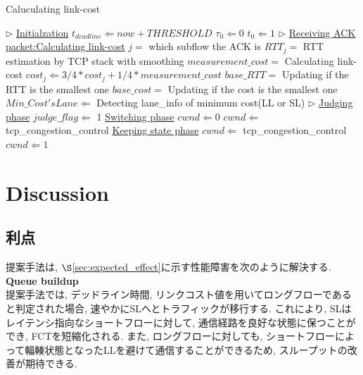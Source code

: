 \begin{algorithm}
\caption{Caluculating link-cost}
\label{alg1}
\begin{algorithmic}[1]
\STATE $\triangleright $ \underline{Initialzation}
\STATE $t_{deadline} \Leftarrow now + THRESHOLD$
\STATE $\tau_0 \Leftarrow 0$
\STATE $t_{0} \Leftarrow 1$
\STATE $\triangleright $ \underline{Receiving ACK packet:Calculating link-cost}
\STATE $j = $ which subflow the ACK is
\STATE $RTT_j = $ RTT estimation by TCP stack with smoothing
\STATE $measurement\_cost = $ Calculating link-cost
\STATE $cost_j \Leftarrow 3/4  \ast cost_j + 1/4 \ast measurement\_cost$
\STATE $base\_RTT = $ Updating if the RTT is the smallest one
\STATE $base\_cost = $ Updating if the cost is the smallest one
\STATE $Min\_Cost's Lane \Leftarrow$ Detecting lane\_info of minimum cost(LL
or SL)
\ENDFOR
\STATE $\triangleright $ \underline{Judging phase}
\STATE $judge\_flag \Leftarrow $ 1
\ENDIF
{}
\STATE {$\triangleright$} \underline{Switching phase}
    \STATE $cwnd \Leftarrow 0$
    \ELSE
    \STATE $cwnd \Leftarrow $ tcp\_congestion\_control
    \ENDIF
\ELSE
\STATE {$\triangleright$} \underline{Keeping state phase}
    \STATE $cwnd \Leftarrow $ tcp\_congestion\_control
    \ELSE
    \STATE $cwnd \Leftarrow 1$
    \ENDIF
\ENDIF
\end{algorithmic}
\end{algorithm}

\section{Discussion}

\subsection{利点}
提案手法は, $\S$\ref{sec:expected_effect}に示す性能障害を次のように解決する. \\
{\bf Queue buildup}\\
提案手法では, デッドライン時間, リンクコスト値を用いてロングフローであると判定された場合, 速やかにSLへとトラフィックが移行する. 
これにより, SLはレイテンシ指向なショートフローに対して, 通信経路を良好な状態に保つことができ, FCTを短縮化される. 
また, ロングフローに対しても, ショートフローによって輻輳状態となったLLを避けて通信することができるため, スループットの改善が期待できる. 

